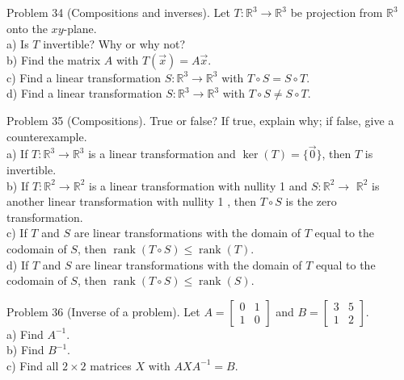 \documentclass[10pt]{article}
\begin{document}
Problem 34 (Compositions and inverses). Let $T: \mathbb{R}^{3} \rightarrow \mathbb{R}^{3}$ be projection from $\mathbb{R}^{3}$ onto the $x y$-plane.\\
a) Is $T$ invertible? Why or why not?\\
b) Find the matrix $A$ with $T(\vec{x})=A \vec{x}$.\\
c) Find a linear transformation $S: \mathbb{R}^{3} \rightarrow \mathbb{R}^{3}$ with $T \circ S=S \circ T$.\\
d) Find a linear transformation $S: \mathbb{R}^{3} \rightarrow \mathbb{R}^{3}$ with $T \circ S \neq S \circ T$.

Problem 35 (Compositions). True or false? If true, explain why; if false, give a counterexample.\\
a) If $T: \mathbb{R}^{3} \rightarrow \mathbb{R}^{3}$ is a linear transformation and $\operatorname{ker}(T)=\{\overrightarrow{0}\}$, then $T$ is invertible.\\
b) If $T: \mathbb{R}^{2} \rightarrow \mathbb{R}^{2}$ is a linear transformation with nullity 1 and $S: \mathbb{R}^{2} \rightarrow$ $\mathbb{R}^{2}$ is another linear transformation with nullity 1 , then $T \circ S$ is the zero transformation.\\
c) If $T$ and $S$ are linear transformations with the domain of $T$ equal to the codomain of $S$, then $\operatorname{rank}(T \circ S) \leq \operatorname{rank}(T)$.\\
d) If $T$ and $S$ are linear transformations with the domain of $T$ equal to the codomain of $S$, then $\operatorname{rank}(T \circ S) \leq \operatorname{rank}(S)$.

Problem 36 (Inverse of a problem). Let $A=\left[\begin{array}{ll}0 & 1 \\ 1 & 0\end{array}\right]$ and $B=\left[\begin{array}{ll}3 & 5 \\ 1 & 2\end{array}\right]$.\\
a) Find $A^{-1}$.\\
b) Find $B^{-1}$.\\
c) Find all $2 \times 2$ matrices $X$ with $A X A^{-1}=B$.
\end{document}

